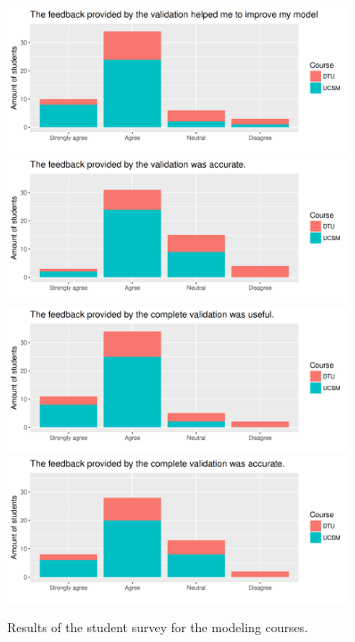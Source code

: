 \begin{figure}
  \centering
	\includegraphics[width=0.9\textwidth]{figures/results/validation_helped_improve}
  \vspace{5pt}
  \newline
  \noindent
	\centering 
	\includegraphics[width=0.9\textwidth]{figures/results/validation_was_accurate}
  \vspace{5pt}
  \newline
  \noindent
	\centering 
	\includegraphics[width=0.9\textwidth]{figures/results/final_was_useful}
  \vspace{5pt}
  \newline
  \noindent
  \centering 
  \includegraphics[width=0.9\textwidth]{figures/results/final_was_accurate}
\caption{Results of the student survey for the modeling courses.}
\label{fig:survey-results}
\end{figure}

